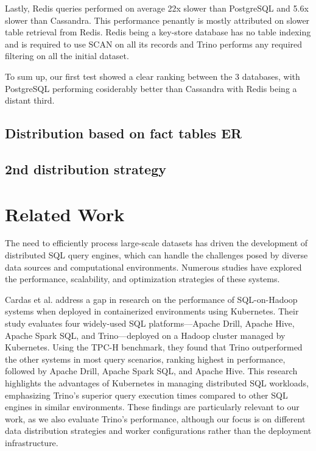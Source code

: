 \documentclass[conference]{IEEEtran}
\begin{document}
Lastly, Redis queries performed on average 22x slower than PostgreSQL and 5.6x slower than Cassandra. This performance penantly is mostly attributed on slower table retrieval from Redis. Redis being a key-store database has no table indexing and is required to use SCAN on all its records and Trino performs any required filtering on all the initial dataset.

To sum up, our first test showed a clear ranking between the 3 databases, with PostgreSQL performing cosiderably better than Cassandra with Redis being a distant third.

\subsection{Distribution based on fact tables ER}
\label{sec:distribution-based-on-fact-tables-er}


\subsection{2nd distribution strategy}
\label{sec:2nd-distribution-strategy}

\section{Related Work}

The need to efficiently process large-scale datasets has driven the development of distributed SQL
query engines, which can handle the challenges posed by diverse data sources and computational
environments. Numerous studies have explored the performance, scalability, and optimization
strategies of these systems.

Cardas et al. \cite{b11} address a gap in research on the performance of SQL-on-Hadoop systems
when deployed in containerized environments using Kubernetes. Their study evaluates four
widely-used SQL platforms—Apache Drill, Apache Hive, Apache Spark SQL, and Trino—deployed
on a Hadoop cluster managed by Kubernetes. Using the TPC-H benchmark, they found that Trino
outperformed the other systems in most query scenarios, ranking highest in performance, followed
by Apache Drill, Apache Spark SQL, and Apache Hive. This research highlights the advantages of
Kubernetes in managing distributed SQL workloads, emphasizing Trino’s superior query execution
times compared to other SQL engines in similar environments. These findings are particularly
relevant to our work, as we also evaluate Trino's performance, although our focus is on different
data distribution strategies and worker configurations rather than the deployment infrastructure.
\end{document}
